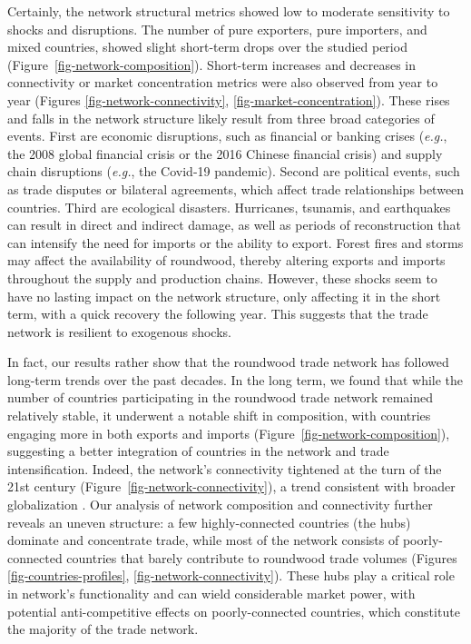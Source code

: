 \documentclass[
  authoryear,
  review,
  3p]{elsarticle}
\begin{document}
Certainly, the network structural metrics showed low to moderate
sensitivity to shocks and disruptions. The number of pure exporters,
pure importers, and mixed countries, showed slight short-term drops over
the studied period (Figure~\ref{fig-network-composition}). Short-term
increases and decreases in connectivity or market concentration metrics
were also observed from year to year (Figures
\ref{fig-network-connectivity}, \ref{fig-market-concentration}). These
rises and falls in the network structure likely result from three broad
categories of events. First are economic disruptions, such as financial
or banking crises (\emph{e.g.}, the 2008 global financial crisis or the
2016 Chinese financial crisis) and supply chain disruptions
(\emph{e.g.}, the Covid-19 pandemic). Second are political events, such
as trade disputes
\citep{van_kooten_global_2014, johnston_impact_2017, pan_impacts_2021}
or bilateral agreements, which affect trade relationships between
countries. Third are ecological disasters. Hurricanes, tsunamis, and
earthquakes can result in direct and indirect damage, as well as periods
of reconstruction that can intensify the need for imports or the ability
to export. Forest fires and storms may affect the availability of
roundwood, thereby altering exports and imports throughout the supply
and production chains. However, these shocks seem to have no lasting
impact on the network structure, only affecting it in the short term,
with a quick recovery the following year. This suggests that the trade
network is resilient to exogenous shocks.

In fact, our results rather show that the roundwood trade network has
followed long-term trends over the past decades. In the long term, we
found that while the number of countries participating in the roundwood
trade network remained relatively stable, it underwent a notable shift
in composition, with countries engaging more in both exports and imports
(Figure~\ref{fig-network-composition}), suggesting a better integration
of countries in the network and trade intensification. Indeed, the
network's connectivity tightened at the turn of the 21st century
(Figure~\ref{fig-network-connectivity}), a trend consistent with broader
globalization \citep{prestemon_international_2003}. Our analysis of
network composition and connectivity further reveals an uneven
structure: a few highly-connected countries (the hubs) dominate and
concentrate trade, while most of the network consists of
poorly-connected countries that barely contribute to roundwood trade
volumes (Figures \ref{fig-countries-profiles},
\ref{fig-network-connectivity}). These hubs play a critical role in
network's functionality \citep{huang_static_2024} and can wield
considerable market power, with potential anti-competitive effects on
poorly-connected countries, which constitute the majority of the trade
network.
\end{document}
